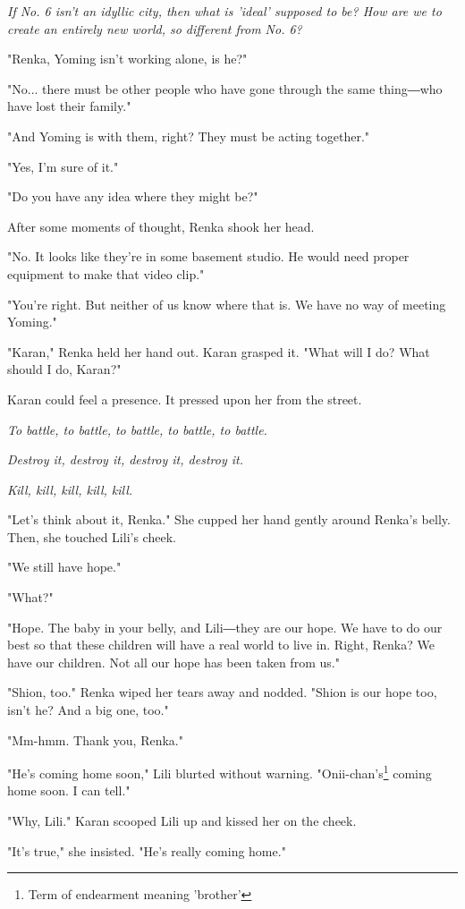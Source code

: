 \emph{If No. 6 isn't an idyllic city, then what is 'ideal' supposed to be? How
are we to create an entirely new world, so different from No. 6?}

"Renka, Yoming isn't working alone, is he?"

"No... there must be other people who have gone through the same
thing―who have lost their family."

"And Yoming is with them, right? They must be acting together."

"Yes, I'm sure of it."

"Do you have any idea where they might be?"

After some moments of thought, Renka shook her head.

"No. It looks like they're in some basement studio. He would need proper
equipment to make that video clip."

"You're right. But neither of us know where that is. We have no way of
meeting Yoming."

"Karan," Renka held her hand out. Karan grasped it. "What will I do?
What should I do, Karan?"

Karan could feel a presence. It pressed upon her from the street.

\emph{To battle, to battle, to battle, to battle, to battle.}

\emph{Destroy it, destroy it, destroy it, destroy it.}

\emph{Kill, kill, kill, kill, kill.}

"Let's think about it, Renka." She cupped her hand gently around Renka's
belly. Then, she touched Lili's cheek.

"We still have hope."

"What?"

"Hope. The baby in your belly, and Lili―they are our hope. We have to do
our best so that these children will have a real world to live in.
Right, Renka? We have our children. Not all our hope has been taken from
us."

"Shion, too." Renka wiped her tears away and nodded. "Shion is our hope
too, isn't he? And a big one, too."

"Mm-hmm. Thank you, Renka."

"He's coming home soon," Lili blurted without warning. "Onii-chan's\footnote{Term of endearment meaning 'brother'}
coming home soon. I can tell."

"Why, Lili." Karan scooped Lili up and kissed her on the cheek.

"It's true," she insisted. "He's really coming home."

